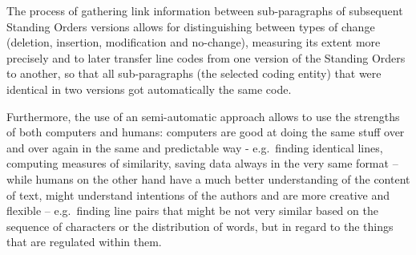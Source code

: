 \documentclass[10pt,]{article}
\newenvironment{Shaded}{\begin{snugshade}}{\end{snugshade}}
\newcommand{\KeywordTok}[1]{\textcolor[rgb]{0.13,0.29,0.53}{\textbf{{#1}}}}
\newcommand{\DataTypeTok}[1]{\textcolor[rgb]{0.13,0.29,0.53}{{#1}}}
\newcommand{\CharTok}[1]{\textcolor[rgb]{0.31,0.60,0.02}{{#1}}}
\newcommand{\StringTok}[1]{\textcolor[rgb]{0.31,0.60,0.02}{{#1}}}
\newcommand{\CommentTok}[1]{\textcolor[rgb]{0.56,0.35,0.01}{\textit{{#1}}}}
\newcommand{\NormalTok}[1]{{#1}}
\begin{document}
The process of gathering link information between sub-paragraphs of
subsequent Standing Orders versions allows for distinguishing between
types of change (deletion, insertion, modification and no-change),
measuring its extent more precisely and to later transfer line codes
from one version of the Standing Orders to another, so that all
sub-paragraphs (the selected coding entity) that were identical in two
versions got automatically the same code.

Furthermore, the use of an semi-automatic approach allows to use the
strengths of both computers and humans: computers are good at doing the
same stuff over and over again in the same and predictable way -
e.g.~finding identical lines, computing measures of similarity, saving
data always in the very same format -- while humans on the other hand
have a much better understanding of the content of text, might
understand intentions of the authors and are more creative and flexible
-- e.g.~finding line pairs that might be not very similar based on the
sequence of characters or the distribution of words, but in regard to
the things that are regulated within them.

\begin{Shaded}
\end{Shaded}
\end{document}
